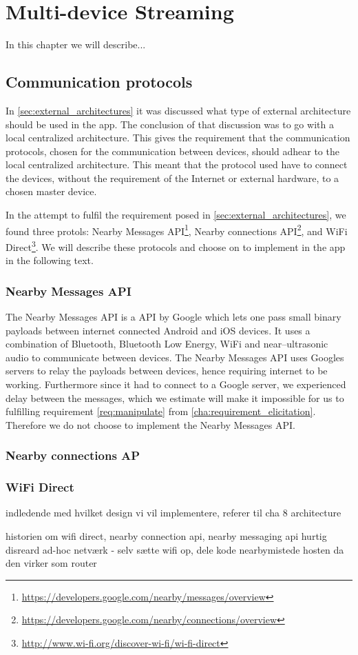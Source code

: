 \chapter{Multi-device Streaming}
In this chapter we will describe...

\section{Communication protocols}
In \cref{sec:external_architectures} it was discussed what type of external architecture should be used in the app.
The conclusion of that discussion was to go with a local centralized architecture.
This gives the requirement that the communication protocols, chosen for the communication between devices,
should adhear to the local centralized architecture.
This meant that the protocol used have to connect the devices, without the requirement of the Internet or external hardware, to a chosen master device.

In the attempt to fulfil the requirement posed in \cref{sec:external_architectures}, we found three protols: Nearby Messages API\footnote{\url{https://developers.google.com/nearby/messages/overview}}, Nearby connections API\footnote{\url{https://developers.google.com/nearby/connections/overview}}, and WiFi Direct\footnote{\url{http://www.wi-fi.org/discover-wi-fi/wi-fi-direct}}.
We will describe these protocols and choose on to implement in the app in the following text.

\subsection{Nearby Messages API}
The Nearby Messages API is a API by Google which lets one pass small binary payloads between internet connected Android and iOS devices. 
It uses a combination of Bluetooth, Bluetooth Low Energy, WiFi and near--ultrasonic audio to communicate between devices.
The Nearby Messages API uses Googles servers to relay the payloads between devices, hence requiring internet to be working. 
Furthermore since it had to connect to a Google server, we experienced delay between the messages,
which we estimate will make it impossible for us to fulfilling requirement \ref{req:manipulate} from \cref{cha:requirement_elicitation}.
Therefore we do not choose to implement the Nearby Messages API.\cite{nearby_messages}

\subsection{Nearby connections AP}


\subsection{WiFi Direct}


indledende med hvilket design vi vil implementere, referer til cha 8 architecture

historien om wifi direct, nearby connection api, nearby messaging api
hurtig disreard ad-hoc netværk - selv sætte wifi op, dele kode
nearbymistede hosten da den virker som router